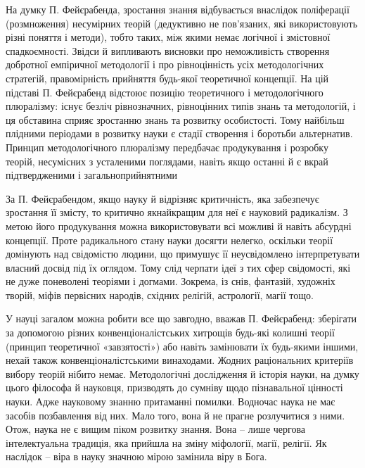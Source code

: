 На думку П. Фейєрабенда, зростання знання відбувається внаслідок
поліферації (розмноження) несумірних теорій (дедуктивно не пов’язаних, які
використовують різні поняття і методи), тобто таких, між якими немає логічної
і змістовної спадкоємності. Звідси й випливають висновки про неможливість
створення добротної емпіричної методології і про рівноцінність усіх
методологічних стратегій, правомірність прийняття будь-якої теоретичної
концепції. На цій підставі П. Фейєрабенд відстоює позицію теоретичного і
методологічного плюралізму: існує безліч рівнозначних, рівноцінних типів
знань та методологій, і ця обставина сприяє зростанню знань та розвитку
особистості. Тому найбільш плідними періодами в розвитку науки є стадії
створення і боротьби альтернатив. Принцип методологічного плюралізму
передбачає продукування і розробку теорій, несумісних з усталеними
поглядами, навіть якщо останні й є вкрай підтвердженими і
загальноприйнятними

За П. Фейєрабендом, якщо науку й відрізняє критичність, яка забезпечує
зростання її змісту, то критично якнайкращим для неї є науковий радикалізм. З
метою його продукування можна використовувати всі можливі й навіть
абсурдні концепції. Проте радикального стану науки досягти нелегко, оскільки
теорії домінують над свідомістю людини, що примушує її неусвідомлено
інтерпретувати власний досвід під їх оглядом. Тому слід черпати ідеї з тих сфер
свідомості, які не дуже поневолені теоріями і догмами. Зокрема, із снів,
фантазій, художніх творій, міфів первісних народів, східних релігій, астрології,
магії тощо.

У науці загалом можна робити все що завгодно, вважав П. Фейєрабенд:
зберігати за допомогою різних конвенціоналістських хитрощів будь-які
колишні теорії (принцип теоретичної «завзятості») або навіть замінювати їх
будь-якими іншими, нехай також конвенціоналістськими винаходами. Жодних
раціональних критеріїв вибору теорій нібито немає. Методологічні дослідження
й історія науки, на думку цього філософа й науковця, призводять до сумніву
щодо пізнавальної цінності науки. Адже науковому знанню притаманні
помилки. Водночас наука не має засобів позбавлення від них. Мало того, вона й
не прагне розлучитися з ними. Отож, наука не є вищим піком розвитку знання.
Вона – лише чергова інтелектуальна традиція, яка прийшла на зміну міфології,
магії, релігії. Як наслідок – віра в науку значною мірою замінила віру в Бога.

